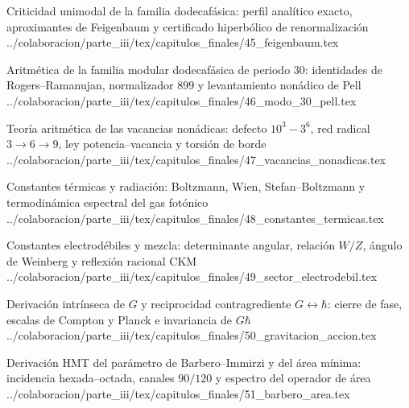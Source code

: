 \begin{HMTScientificOwnerSubordinated}

\end{HMTScientificOwnerSubordinated}

\HMTSuccessorChapterInput
  {Criticidad unimodal de la familia dodecafásica: perfil analítico exacto, aproximantes de Feigenbaum y certificado hiperbólico de renormalización}
  {../colaboracion/parte_iii/tex/capitulos_finales/45_feigenbaum.tex}

\HMTSuccessorChapterInput
  {Aritmética de la familia modular dodecafásica de periodo \(30\): identidades de Rogers--Ramanujan, normalizador \(899\) y levantamiento nonádico de Pell}
  {../colaboracion/parte_iii/tex/capitulos_finales/46_modo_30_pell.tex}
\begin{HMTSpiralChapterBody}

\end{HMTSpiralChapterBody}

\HMTSuccessorChapterInput
  {Teoría aritmética de las vacancias nonádicas: defecto \texorpdfstring{\(10^3-3^6\)}{10^3-3^6}, red radical \(3\to6\to9\), ley potencia--vacancia y torsión de borde}
  {../colaboracion/parte_iii/tex/capitulos_finales/47_vacancias_nonadicas.tex}

\HMTSuccessorChapterInput
  {Constantes térmicas y radiación: Boltzmann, Wien, Stefan--Boltzmann y termodinámica espectral del gas fotónico}
  {../colaboracion/parte_iii/tex/capitulos_finales/48_constantes_termicas.tex}

\HMTSuccessorChapterInput
  {Constantes electrodébiles y mezcla: determinante angular, relación \(W/Z\), ángulo de Weinberg y reflexión racional CKM}
  {../colaboracion/parte_iii/tex/capitulos_finales/49_sector_electrodebil.tex}

\HMTSuccessorChapterInput
  {Derivación intrínseca de \(G\) y reciprocidad contragrediente \texorpdfstring{\(G\leftrightarrow\hbar\)}{G<->hbar}: cierre de fase, escalas de Compton y Planck e invariancia de \(G\hbar\)}
  {../colaboracion/parte_iii/tex/capitulos_finales/50_gravitacion_accion.tex}


\HMTSuccessorChapterInput
  {Derivación HMT del parámetro de Barbero--Immirzi y del área mínima: incidencia hexada--octada, canales \(90/120\) y espectro del operador de área}
  {../colaboracion/parte_iii/tex/capitulos_finales/51_barbero_area.tex}


